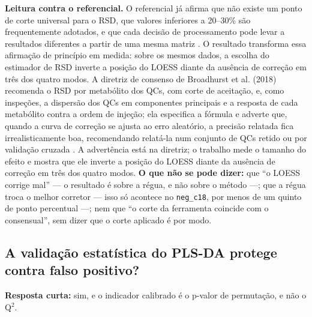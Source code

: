 
\textbf{Leitura contra o referencial.} O referencial já afirma que não existe um ponto de corte universal para o RSD, que valores inferiores a 20--30\% são frequentemente adotados, e que cada decisão de processamento pode levar a resultados diferentes a partir de uma mesma matriz \cite{diguida2016non}. O resultado transforma essa afirmação de princípio em medida: sobre os mesmos dados, a escolha do estimador de RSD inverte a posição do LOESS diante da ausência de correção em três dos quatro modos. A diretriz de consenso de Broadhurst et al. (2018) recomenda o RSD por metabólito dos QCs, com corte de aceitação, e, como inspeções, a dispersão dos QCs em componentes principais e a resposta de cada metabólito contra a ordem de injeção; ela especifica a fórmula e adverte que, quando a curva de correção se ajusta ao erro aleatório, a precisão relatada fica irrealisticamente boa, recomendando relatá-la num conjunto de QCs retido ou por validação cruzada \cite{broadhurst2018guidelines}. A advertência está na diretriz; o trabalho mede o tamanho do efeito e mostra que ele inverte a posição do LOESS diante da ausência de correção em três dos quatro modos. \textbf{O que não se pode dizer:} que ``o LOESS corrige mal'' --- o resultado é sobre a régua, e não sobre o método ---; que a régua troca o melhor corretor --- isso só acontece no \texttt{neg\_\allowbreak{}c18}, por menos de um quinto de ponto percentual ---; nem que ``o corte da ferramenta coincide com o consensual'', sem dizer que o corte aplicado é por modo.


\subsection{A validação estatística do PLS-DA protege contra falso positivo?}\label{sec:5-3-3}

\textbf{Resposta curta:} sim, e o indicador calibrado é o p-valor de permutação, e não o Q$^{2}$.

